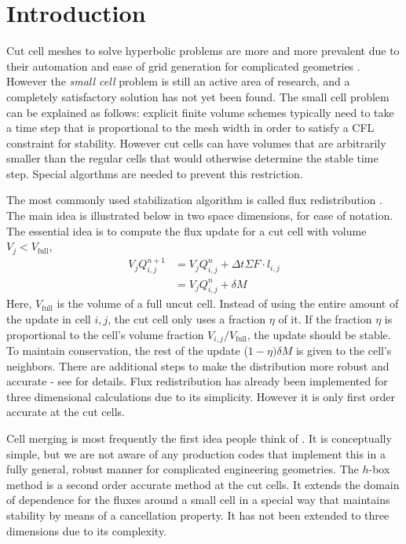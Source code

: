 \section{Introduction}\label{sec:intro}
Cut cell meshes to solve hyperbolic problems 
are more and more prevalent due to their automation and ease 
of grid generation for complicated geometries \cite{}. 
However the {\em small cell} problem is still an active area of research, and
a completely satisfactory solution has not yet been found.
The small cell problem can be explained as follows: explicit
finite volume schemes typically need to take a time step 
that is proportional to the mesh width in order to satisfy a CFL constraint for
stability. However cut cells can have volumes that are arbitrarily
smaller than the regular cells that would otherwise determine the stable time
step. Special algorthms are needed to prevent this restriction.

The most commonly used stabilization algorithm is called flux
redistribution \cite{}. The main idea is illustrated below in two space
dimensions, for ease of notation.
The essential idea is to compute the 
flux update for a cut cell with volume $V_j < V_{\mbox{full}}$,
\begin{eqnarray*}
V_j Q_{i,j} ^{n+1} & = V_j Q_{i,j}^n  +  \Delta t \Sigma F \cdot l_{i,j}\\
                   & = V_j Q_{i,j}^n  +  \delta  M 
\end{eqnarray*}
Here, $V_{\mbox{full}}$ is the volume of a full uncut cell.
Instead of using the entire amount of the update in cell ${i,j}$, 
the cut cell only uses a fraction $\eta$ of it.  If the fraction $\eta$
is proportional to the cell's volume
fraction $V_{i,j}/V_{\mbox{full}}$, the update should be stable. 
To maintain conservation, the rest of the update ($1-\eta)\delta M$
is given to the cell's neighbors.  
There are additional steps to make the distribution more robust and
accurate - see \cite{} for details.
Flux redistribution has already been implemented for three dimensional
calculations due to its simplicity. However it is only first order
accurate at the cut cells.

Cell merging is most frequently the first idea people 
think of \cite{}. It is conceptually simple, but 
we are not aware of any production codes that implement this in a fully
general, robust manner for complicated engineering geometries. 
The $h$-box method \cite{}
is a second order accurate method at the cut cells. It extends the 
domain of dependence for the fluxes around a small cell in a 
special way that maintains stability by means of a cancellation
property. It  has not been extended to
three dimensions due to its complexity. 

